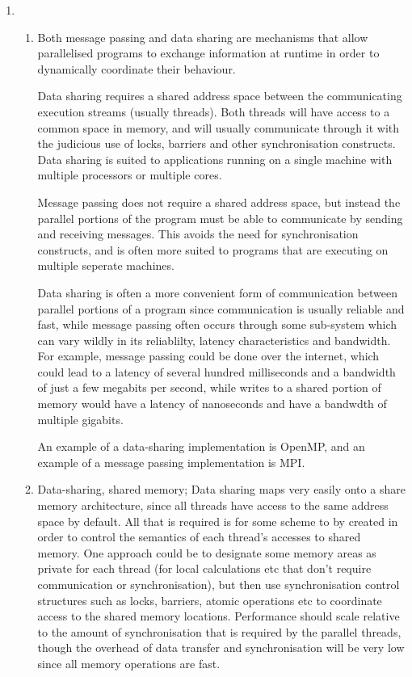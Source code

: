 \documentclass{report}
\begin{document}
\begin{enumerate}
\item \begin{enumerate}
  \item Both message passing and data sharing are mechanisms that
    allow parallelised programs to exchange information at runtime in
    order to dynamically coordinate their behaviour.

    Data sharing requires a shared address space between the
    communicating execution streams (usually threads). Both threads
    will have access to a common space in memory, and will usually
    communicate through it with the judicious use of locks, barriers
    and other synchronisation constructs. Data sharing is suited to
    applications running on a single machine with multiple processors
    or multiple cores.

    Message passing does not require a shared address space, but
    instead the parallel portions of the program must be able to
    communicate by sending and receiving messages. This avoids the
    need for synchronisation constructs, and is often more suited to
    programs that are executing on multiple seperate machines.

    Data sharing is often a more convenient form of communication
    between parallel portions of a program since communication is
    usually reliable and fast, while message passing often occurs
    through some sub-system which can vary wildly in its reliablilty,
    latency characteristics and bandwidth. For example, message
    passing could be done over the internet, which could lead to a
    latency of several hundred milliseconds and a bandwidth of just a
    few megabits per second, while writes to a shared portion of
    memory would have a latency of nanoseconds and have a bandwdth of
    multiple gigabits.
    
    An example of a data-sharing implementation is OpenMP, and an
    example of a message passing implementation is MPI.
  \item Data-sharing, shared memory; Data sharing maps very easily
    onto a share memory architecture, since all threads have access to
    the same address space by default. All that is required is for
    some scheme to by created in order to control the semantics of
    each thread's accesses to shared memory. One approach could be to
    designate some memory areas as private for each thread (for local
    calculations etc that don't require communication or
    synchronisation), but then use synchronisation control structures
    such as locks, barriers, atomic operations etc to coordinate
    access to the shared memory locations. Performance should scale
    relative to the amount of synchronisation that is required by the
    parallel threads, though the overhead of data transfer and
    synchronisation will be very low since all memory operations are
    fast.


\end{enumerate}
\end{enumerate}
\end{document}
